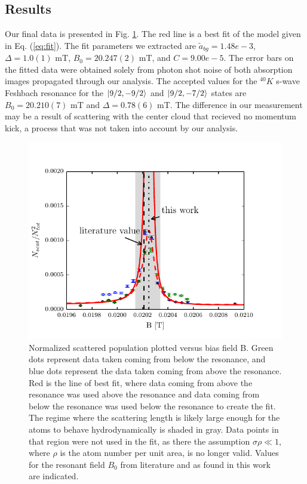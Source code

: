 \documentclass[12pt]{iopart}
\begin{document}
\subsection{Results}
Our final data is presented in Fig. \ref{fig:fittedFractions}. The red line is a best fit of the model given in Eq. (\ref{eq:fit}). The fit parameters we extracted are $\tilde{a}_{bg}=1.48e-3$, $\Delta = 1.0(1)$ mT, $B_0 = 20.247(2)$ mT, and $C=9.00e-5$. The error bars on the fitted data were obtained solely from photon shot noise of both absorption images propagated through our analysis.
The accepted values for the $^{40}K$ s-wave Feshbach resonance for the  $\mathinner{|{9/2,-9/2}\rangle}$ and $\mathinner{|{9/2,-7/2}\rangle}$ states are $B_0=20.210(7)$ mT and $\Delta=0.78(6)$ mT. The difference in our measurement may be a result of scattering with the center cloud that recieved no momentum kick, a process that was not taken into account by our analysis. 
\begin{figure}
	\includegraphics{figure11.pdf}
\caption{Normalized scattered population plotted versus bias field B. Green dots represent data taken coming from below the resonance, and blue dots represent the data taken coming from above the resonance. Red is the line of best fit, where data coming from above the resonance was used above the resonance and data coming from below the resonance was used below the resonance to create the fit. The regime where the scattering length is likely large enough for the atoms to behave hydrodynamically is shaded in gray. Data points in that region were not used in the fit, as there the assumption $\sigma\rho\ll1$, where $\rho$ is the atom number per unit area, is no longer valid. Values for the resonant field $B_0$ from literature and as found in this work are indicated.    }  
\label{fig:fittedFractions}
\end{figure}
\end{document}
